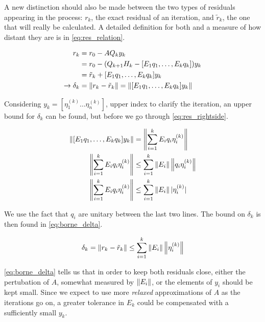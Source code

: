 A new distinction should also be made between the two types of residuals appearing in the process: $r_{k}$, the exact residual of an iteration, and $\tilde{r}_{k}$, the one that will really be calculated. A detailed definition for both and a measure of how distant they are is in \ref{eq:res_relation}.

\begin{align}\label{eq:res_relation}
    \begin{split}
        r_{k} &= r_{0} - AQ_{k}y_{k}\\
        &= r_{0} - (Q_{k+1}H_{k} - [E_{1}q_{1},\dots , E_{k}q_{k}])y_{k}\\
        &= \tilde{r}_{k} +[E_{1}q_{1},\dots , E_{k}q_{k}]y_{k}\\
        \rightarrow \delta_{k} &= \left\lVert r_{k} - \tilde{r}_{k}\right\rVert  = \left\lVert[E_{1}q_{1},\dots , E_{k}q_{k}]y_{k}\right\rVert
    \end{split}
\end{align}

Considering $y_{k} = [\eta_{1}^{(k)} \dots \eta_{n}^{(k)} ] $, upper index to clarify the iteration, an upper bound for $\delta_{k}$ can be found, but before we go through \ref{eq:res_rightside}.

\begin{align}\label{eq:res_rightside}
    \begin{split}
        \left\lVert[E_{1}q_{1},\dots , E_{k}q_{k}]y_{k}\right\rVert & = \left\lVert\sum_{i=1}^{k}E_{i}q_{i}\eta^{(k)}_{i}\right\rVert\\
        \left\lVert\sum_{i=1}^{k}E_{i}q_{i}\eta^{(k)}_{i}\right\rVert & \leq \sum_{i=1}^{k}\left\lVert E_{i}\right\rVert\left\lVert q_{i}\eta^{(k)}_{i}\right\rVert\\
        \left\lVert\sum_{i=1}^{k}E_{i}q_{i}\eta^{(k)}_{i}\right\rVert & \leq \sum_{i=1}^{k}\left\lVert E_{i}\right\rVert|\eta^{(k)}_{i}|
    \end{split}
\end{align}

We use the fact that $q_{i}$ are unitary between the last two lines. The bound on $\delta_{k}$ is then found in \ref{eq:borne_delta}.


\begin{equation}\label{eq:borne_delta}
    \delta_{k} = \left\lVert r_{k} - \tilde{r}_{k}\right\rVert \leq \sum_{i=1}^{k} \left\lVert E_{i}\right\rVert \left\lVert\eta_{i}^{(k)}\right\rVert
\end{equation}

\ref{eq:borne_delta} tells us that in order to keep both residuals close, either the pertubation of $A$, somewhat measured by $\left\lVert E_{i}\right\rVert$, or the elements of $y_{i}$ should be kept small. Since we expect to use more \textit{relaxed} approximations of $A$ as the iterations go on, a greater tolerance in $E_{k}$ could be compensated with a sufficiently small $y_{k}$.


